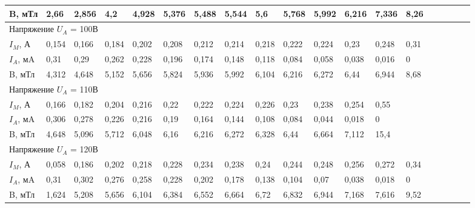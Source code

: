 \documentclass{article}
\begin{document}
\begin{table}[h]
{\begin{tabular}{|lllllllllllllllllll|}
\multicolumn{1}{|l|}{\cellcolor[HTML]{F7C7AC}B, мТл} & 2,66  & 2,856 & 4,2   & 4,928 & 5,376 & 5,488 & 5,544 & 5,6   & 5,768 & 5,992 & 6,216 & 7,336  & 8,26  &       &       &       &      &      \\ \hline
\multicolumn{19}{|l|}{\cellcolor[HTML]{C1F0C8}Напряжение $U_A$ = 100В}                                                                                                                              \\ \hline
\multicolumn{1}{|l|}{$I_M$, А}                       & 0,154 & 0,166 & 0,184 & 0,202 & 0,208 & 0,212 & 0,214 & 0,218 & 0,222 & 0,224 & 0,23  & 0,248  & 0,31  &       &       &       &      &      \\
\multicolumn{1}{|l|}{$I_A$, мA}                      & 0,31  & 0,29  & 0,262 & 0,228 & 0,196 & 0,174 & 0,148 & 0,118 & 0,084 & 0,058 & 0,038 & 0,016  & 0     &       &       &       &      &      \\
\multicolumn{1}{|l|}{\cellcolor[HTML]{F7C7AC}B, мТл} & 4,312 & 4,648 & 5,152 & 5,656 & 5,824 & 5,936 & 5,992 & 6,104 & 6,216 & 6,272 & 6,44  & 6,944  & 8,68  &       &       &       &      &      \\ \hline
\multicolumn{19}{|l|}{\cellcolor[HTML]{C1F0C8}Напряжение $U_A$ = 110В}                                                                                                                              \\ \hline
\multicolumn{1}{|l|}{$I_M$, А}                       & 0,166 & 0,182 & 0,204 & 0,216 & 0,22  & 0,222 & 0,224 & 0,226 & 0,23  & 0,238 & 0,254 & 0,55   &       &       &       &       &      &      \\
\multicolumn{1}{|l|}{$I_A$, мA}                      & 0,306 & 0,278 & 0,226 & 0,216 & 0,19  & 0,164 & 0,144 & 0,108 & 0,084 & 0,044 & 0,018 & 0      &       &       &       &       &      &      \\
\multicolumn{1}{|l|}{\cellcolor[HTML]{F7C7AC}B, мТл} & 4,648 & 5,096 & 5,712 & 6,048 & 6,16  & 6,216 & 6,272 & 6,328 & 6,44  & 6,664 & 7,112 & 15,4   &       &       &       &       &      &      \\ \hline
\multicolumn{19}{|l|}{\cellcolor[HTML]{C1F0C8}Напряжение $U_A$ = 120В}                                                                                                                              \\ \hline
\multicolumn{1}{|l|}{$I_M$, А}                       & 0,058 & 0,186 & 0,202 & 0,218 & 0,228 & 0,234 & 0,238 & 0,24  & 0,244 & 0,248 & 0,256 & 0,272  & 0,34  &       &       &       &      &      \\
\multicolumn{1}{|l|}{$I_A$, мA}                      & 0,31  & 0,302 & 0,276 & 0,258 & 0,228 & 0,202 & 0,178 & 0,138 & 0,104 & 0,07  & 0,038 & 0,018  & 0     &       &       &       &      &      \\
\cellcolor[HTML]{F7C7AC}B, мТл                       & 1,624 & 5,208 & 5,656 & 6,104 & 6,384 & 6,552 & 6,664 & 6,72  & 6,832 & 6,944 & 7,168 & 7,616  & 9,52  &       &       &       &      &      \\ \hline
\end{tabular}%
}
\end{table}
\end{document}
